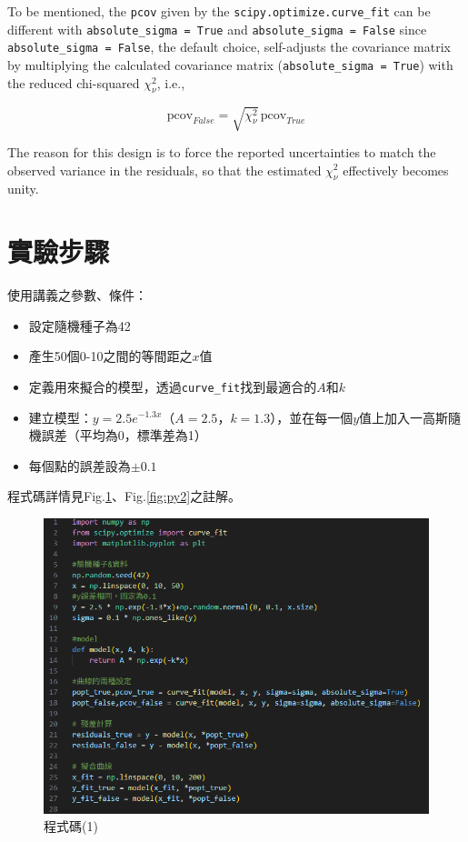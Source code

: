 \documentclass[12pt,a4paper]{article}
\begin{document}
\begin{CJK}{UTF8}{bkai}
To be mentioned, the \texttt{pcov} given by the \texttt{scipy.optimize.curve\_fit} can be different with \texttt{absolute\_sigma = True} and \texttt{absolute\_sigma = False} since \texttt{absolute\_sigma = False}, the default choice, self-adjusts the covariance matrix by multiplying the calculated covariance matrix (\texttt{absolute\_sigma = True}) with the reduced chi-squared $\chi_{\nu}^2$, i.e.,

\begin{equation}
    \text{pcov}_{False} = \sqrt{\chi_{\nu}^{2}}\,\text{pcov}_{True}
\end{equation}

The reason for this design is to force the reported uncertainties to match the observed variance in the residuals, so that the estimated $\chi_{\nu}^{2}$ effectively becomes unity.

\section{實驗步驟}

使用講義之參數、條件：
\begin{itemize}
    \item 設定隨機種子為42
    \item 產生50個0-10之間的等間距之$x$值
    \item 定義用來擬合的模型，透過\texttt{curve\_fit}找到最適合的$A$和$k$
    \item 建立模型：$y=2.5e^{-1.3x}$（$A=2.5$，$k=1.3$），並在每一個$y$值上加入一高斯隨機誤差（平均為0，標準差為1）
    \item 每個點的誤差設為$\pm0.1$
\end{itemize}

程式碼詳情見Fig.\ref{fig:py1}、Fig.\ref{fig:py2}之註解。

\begin{figure}[h]
    \centering
    \includegraphics[width=1\linewidth]{1.png}
    \caption{程式碼(1)}
    \label{fig:py1}
\end{figure}


\end{CJK}
\end{document}
